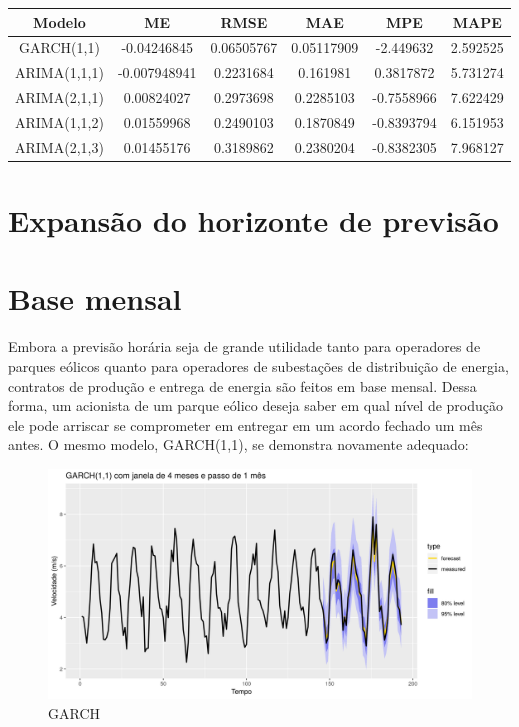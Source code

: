 \documentclass[
	12pt,				%
	openright,			%
	oneside,			%
	a4paper,			%
	english,			%
	french,				%
	spanish,			%
	brazil				%
	]{abntex2}
\begin{document}
\begin{center}
\begin{tabular}{ |c|c|c|c|c|c| } 
\hline
Modelo&ME&RMSE&MAE&MPE&MAPE \\
\hline
GARCH(1,1)&-0.04246845&0.06505767&0.05117909&-2.449632&2.592525 \\
\hline
ARIMA(1,1,1)&-0.007948941&0.2231684&0.161981&0.3817872&5.731274 \\
\hline
ARIMA(2,1,1)&0.00824027&0.2973698&0.2285103&-0.7558966&7.622429 \\
\hline
ARIMA(1,1,2)&0.01559968&0.2490103&0.1870849&-0.8393794&6.151953 \\
\hline
ARIMA(2,1,3)&0.01455176&0.3189862&0.2380204&-0.8382305&7.968127 \\
\hline
\end{tabular}
\end{center}

\section{Expansão do horizonte de previsão}



\section{Base mensal}

Embora a previsão horária seja de grande utilidade tanto para operadores de parques eólicos quanto para operadores de subestações de distribuição de energia, contratos de produção e entrega de energia são feitos em base mensal. Dessa forma, um acionista de um parque eólico deseja saber em qual nível de produção ele pode arriscar se comprometer em entregar em um acordo fechado um mês antes. O mesmo modelo, GARCH(1,1), se demonstra novamente adequado:

\begin{figure}[h]
    \centering
	\includegraphics[width=\textwidth]{garch_month}
	\caption{GARCH}
\end{figure}
\FloatBarrier
\end{document}
